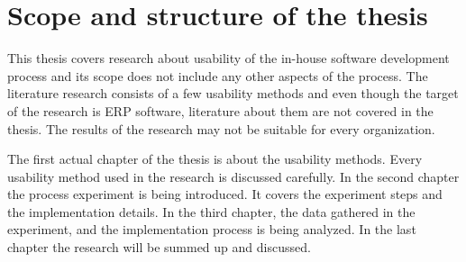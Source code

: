 \documentclass[12pt,a4paper,oneside,pdftex]{report}
\begin{document}
\section{Scope and structure of the thesis}
\label{sec:thescopeandstructureofthethesis}

This thesis covers research about usability of the in-house software development process and its scope does not include any other aspects of the process. The literature  research consists of a few usability methods and even though the target of the research is ERP software, literature about them are not covered in the thesis. The results of the research may not be suitable for every organization.

The first actual chapter of the thesis is about the usability methods. Every usability method used in the research is discussed carefully. In the second chapter the process experiment is being introduced. It covers the experiment steps and the implementation details. In the third chapter, the data gathered in the experiment, and the implementation process is being analyzed. In the last chapter the research will be summed up and discussed.

    
    







\end{document}
